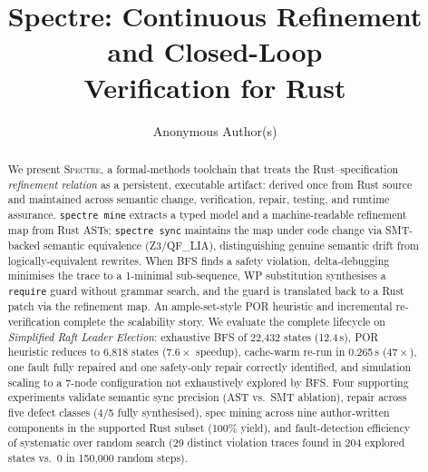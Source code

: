 \documentclass[runningheads]{../paper-vmcai-2027/llncs}
\begin{document}
\title{Spectre: Continuous Refinement and Closed-Loop\\Verification for Rust}

\author{Anonymous Author(s)}


\maketitle

\begin{abstract}
We present \textsc{Spectre}, a formal-methods toolchain that treats the
Rust--specification \emph{refinement relation} as a persistent, executable
artifact: derived once from Rust source and maintained across semantic change,
verification, repair, testing, and runtime assurance.
\texttt{spectre mine} extracts a typed model and a machine-readable
refinement map from Rust ASTs; \texttt{spectre sync} maintains the map under
code change via SMT-backed semantic equivalence (Z3/QF\_LIA), distinguishing
genuine semantic drift from logically-equivalent rewrites.
When BFS finds a safety violation, delta-debugging minimises the trace to a
1-minimal sub-sequence, WP substitution synthesises a \texttt{require} guard
without grammar search, and the guard is translated back to a Rust patch via
the refinement map.
An ample-set-style POR heuristic and incremental re-verification complete the
scalability story.
We evaluate the complete lifecycle on \emph{Simplified Raft Leader Election}:
exhaustive BFS of 22{,}432 states (12.4\,s), POR heuristic reduces to 6{,}818
states ($7.6\times$ speedup), cache-warm re-run in 0.265\,s ($47\times$), one
fault fully repaired and one safety-only repair correctly identified, and
simulation scaling to a 7-node configuration not exhaustively explored by BFS.
Four supporting experiments validate semantic sync precision (AST vs.\ SMT
ablation), repair across five defect classes (4/5 fully synthesised), spec
mining across nine author-written components in the supported Rust subset (100\%
yield), and fault-detection efficiency of systematic over random search
(29 distinct violation traces found in 204 explored states vs.\ 0 in
150{,}000 random steps).
\end{abstract}
\end{document}
